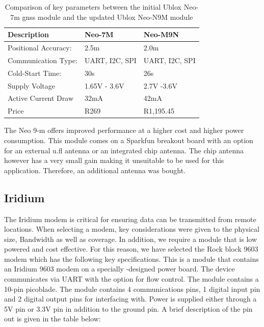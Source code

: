 \begin{table}[H]
	\centering
	\caption{Comparison of key parameters between the initial Ublox Neo-7m gnss module and the updated Ublox Neo-N9M module}
	\begin{tabular}{|l |l |l|}
		\hline
		\textbf{Description} & Neo-7M & Neo-M9N\\
		\hline
		Positional Accuracy: & 2.5m  & 2.0m\\
		Communication Type: & UART, I2C, SPI & UART, I2C, SPI\\
		Cold-Start Time:& 30s & 26s\\
		Supply Voltage & 1.65V - 3.6V & 2.7V -3.6V\\
		Active Current Draw & 32mA &  42mA\\
		Price & R269 \footnotemark & R1,195.45 \footnotemark\\
		\hline
	\end{tabular}
	\label{tab:neo7}
\end{table}
The Neo 9-m offers improved performance at a higher cost and higher power consumption. This module comes on a Sparkfun breakout board with an option for an external u.fl antenna or an integrated chip antenna. The chip antenna however has a very small gain making it unsuitable to be used for this application. Therefore, an additional antenna was bought.

\subsection{Iridium}

The Iridium modem is critical for ensuring data can be transmitted from remote locations. When selecting a modem, key considerations were given to the physical size, Bandwidth as well as coverage. In addition, we require a module that is low powered and cost effective. For this reason, we have selected the Rock block 9603 modem which has the following key specifications. This is a module that contains an Iridium 9603 modem on a specially -designed power board. The device communicates via UART with the option for flow control. The module contains a 10-pin picoblade. The module contains 4 communications pins, 1 digital input pin and 2 digital output pins for interfacing with. Power is supplied either through a 5V pin or 3.3V pin in addition to the ground pin. A brief description of the pin out is given in the table below: 

